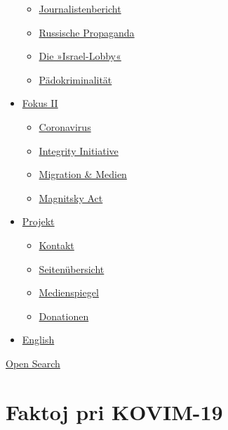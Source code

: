 \begin{itemize}
  \begin{itemize}
  \tightlist
  \item
    \href{https://swprs.org/bericht-eines-journalisten/}{Journalistenbericht}
  \item
    \href{https://swprs.org/russische-propaganda/}{Russische Propaganda}
  \item
    \href{https://swprs.org/die-israel-lobby-fakten-und-mythen/}{Die
    »Israel-Lobby«}
  \item
    \href{https://swprs.org/geopolitik-und-paedokriminalitaet/}{Pädokriminalität}
  \end{itemize}
\item
  \href{https://swprs.org/migration-und-medien/}{Fokus II}

  \begin{itemize}
  \tightlist
  \item
    \href{https://swprs.org/covid-19-hinweis-ii/}{Coronavirus}
  \item
    \href{https://swprs.org/die-integrity-initiative/}{Integrity
    Initiative}
  \item
    \href{https://swprs.org/migration-und-medien/}{Migration \& Medien}
  \item
    \href{https://swprs.org/der-fall-magnitsky/}{Magnitsky Act}
  \end{itemize}
\item
  \href{https://swprs.org/kontakt/}{Projekt}

  \begin{itemize}
  \tightlist
  \item
    \href{https://swprs.org/kontakt/}{Kontakt}
  \item
    \href{https://swprs.org/uebersicht/}{Seitenübersicht}
  \item
    \href{https://swprs.org/medienspiegel/}{Medienspiegel}
  \item
    \href{https://swprs.org/donationen/}{Donationen}
  \end{itemize}
\item
  \href{https://swprs.org/contact/}{English}
\end{itemize}

\protect\hyperlink{}{Open Search}

\hypertarget{faktoj-pri-kovim-19}{%
\section{Faktoj pri KOVIM-19}\label{faktoj-pri-kovim-19}}

